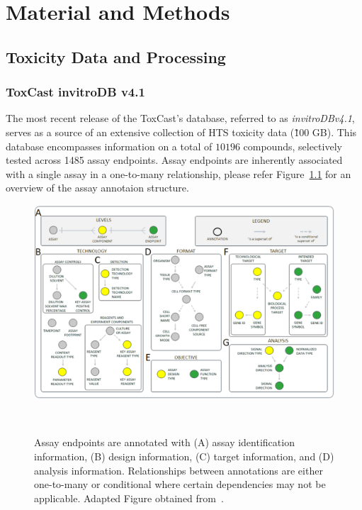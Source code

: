 \chapter{Material and Methods}\label{chap:material_and_methods}

\section{Toxicity Data and Processing}\label{sec:invitrodb}
\subsection{ToxCast invitroDB v4.1}
The most recent release of the ToxCast's database, referred to as \emph{invitroDBv4.1}, serves as a source of an extensive collection of HTS toxicity data (\~100 GB). This database encompasses information on a total of $\num{10196}$ compounds, selectively tested across 1485 assay endpoints. Assay endpoints are inherently associated with a single assay in a one-to-many relationship, please refer Figure~\ref{fig:toxcast_db_annotations_recolored} for an overview of the assay annotaion structure.

\begin{figure}  %
    \centering
    \includegraphics[width=1.0\textwidth]{figures/toxcast_db_annotations_recolored.png}  
    \caption{Assay endpoints are annotated with (A) assay
    identification information, (B) design information, (C) target information, and (D) analysis information. Relationships between annotations are either one-to-many or conditional where certain dependencies may not be applicable. Adapted Figure obtained from~\cite{userguide}.}
~\label{fig:toxcast_db_annotations_recolored} 
\end{figure}

